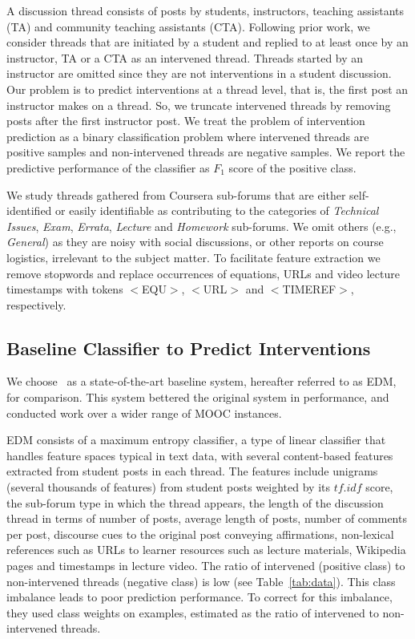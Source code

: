 \documentclass[11pt,a4paper]{article}
\begin{document}
A discussion thread consists of posts by students, instructors,
teaching assistants (TA) and community teaching assistants (CTA).
Following prior work, we consider threads that are initiated by a
student and replied to at least once by an instructor, TA or a CTA as
an intervened thread. Threads started by an instructor 
are omitted since they are not interventions in a student discussion.
Our problem is to predict interventions at a thread level, that is, the 
first post an instructor makes on a thread. So, we truncate intervened 
threads by removing posts after the first instructor post.
We treat the problem of intervention prediction
as a binary classification problem where intervened threads are
positive samples and non-intervened threads are negative samples. We
report the predictive performance of the classifier as $F_1$ score of
the positive class.

We study threads gathered from Coursera sub-forums that are either
self-identified or easily identifiable as contributing to the
categories of {\it Technical Issues}, {\it Exam}, {\it Errata}, {\it
  Lecture} and {\it Homework} sub-forums. We omit others (e.g., {\it
  General}) as they are noisy with social discussions, or other
reports on course logistics, irrelevant to the subject matter.  To
facilitate feature extraction we remove stopwords and replace
occurrences of equations, URLs and video lecture timestamps with
tokens $<$EQU$>$, $<$URL$>$ and $<$TIMEREF$>$, respectively.


\subsection{Baseline Classifier to Predict Interventions}
\label{sect:baseline}
We choose~\cite{chandrasekaran2015} as a state-of-the-art baseline
system, hereafter referred to as EDM, for comparison.  This system
bettered the original \cite{chaturvedi2014} system in performance, and
conducted work over a wider range of MOOC instances.  

EDM consists of a maximum entropy classifier, a type of linear
classifier that handles feature spaces typical in text data, with
several content-based features extracted from student posts in each
thread. The features include unigrams (several thousands of features)
from student posts weighted by its $tf.idf$ score, the sub-forum type
in which the thread appears, the length of the discussion thread in
terms of number of posts, average length of posts, number of comments
per post, discourse cues to the original post conveying affirmations,
non-lexical references such as URLs to learner resources such as
lecture materials, Wikipedia pages and timestamps in lecture
video. The ratio of intervened (positive class) to non-intervened
threads (negative class) is low (see Table~\ref{tab:data}). This
class imbalance leads to poor prediction performance. To correct for
this imbalance, they used class weights on examples, estimated as the
ratio of intervened to non-intervened threads.
\end{document}
